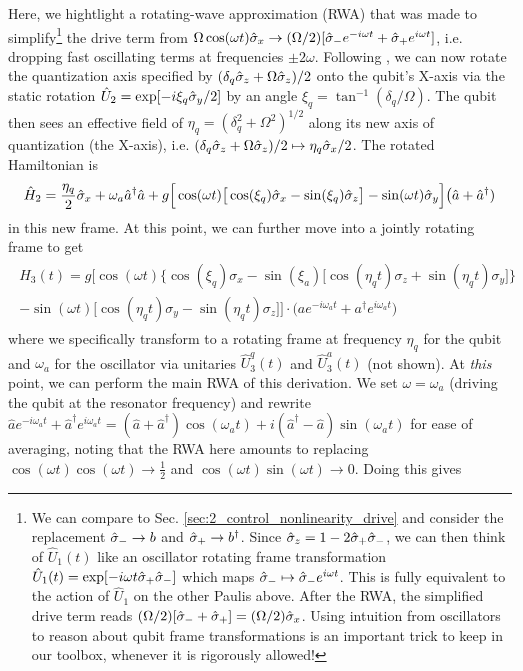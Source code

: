 Here, we hightlight a rotating-wave approximation (RWA) that was made to simplify\footnote{We can compare to Sec. \ref{sec:2_control_nonlinearity_drive} and consider the replacement $\hat{\sigma}_- \to b$ and $\hat{\sigma}_+\to b^\dagger$. Since $\hat{\sigma}_z = 1-2\hat{\sigma}_+\hat{\sigma}_-$, we can then think of $\hat{U}_1(t)$ like an oscillator rotating frame transformation $\hat{U}_1(t) = \exp[-i\omega t \hat{\sigma}_+\hat{\sigma}_-]$ which maps $\hat{\sigma}_- \mapsto \hat{\sigma}_- e^{i\omega t}$. This is fully equivalent to the action of $\hat{U}_1$ on the other Paulis above. After the RWA, the simplified drive term reads $(\Omega/2)[\hat{\sigma}_- + \hat{\sigma}_+] = (\Omega/2)\hat{\sigma}_x$. Using intuition from oscillators to reason about qubit frame transformations is an important trick to keep in our toolbox, whenever it is rigorously allowed!} the drive term from $\Omega \cos(\omega t)\hat{\sigma}_x \to (\Omega/2)[\hat{\sigma}_- e^{-i\omega t} + \hat{\sigma}_+ e^{i\omega t}]$, i.e. dropping fast oscillating terms at frequencies $\pm 2\omega$. Following \cite{rigetti2010fully}, we can now rotate the quantization axis specified by $(\delta_q\hat{\sigma}_z + \Omega\hat{\sigma}_z)/2$ onto the qubit's X-axis via the static rotation $\hat{U}_2 = \exp[-i\xi_q\hat{\sigma}_y/2]$ by an angle $\xi_q = \tan^{-1}(\delta_q/\Omega)$. The qubit then sees an effective field of $\eta_q = (\delta_q^2 + \Omega^2)^{1/2}$ along its new axis of quantization (the X-axis), i.e. $(\delta_q\hat{\sigma}_z + \Omega\hat{\sigma}_z)/2 \mapsto \eta_q\hat{\sigma}_x/2$. The rotated Hamiltonian is
\begin{equation}
\hat{H}_2 = \frac{\eta_q}{2}\hat{\sigma}_x + \omega_a \hat{a}^\dagger \hat{a} + g\Big[\cos(\omega t)\big[\cos(\xi_q)\hat{\sigma}_x -\sin(\xi_q)\hat{\sigma}_z\big]- \sin(\omega t)\hat{\sigma}_y\Big]\big(\hat{a} + \hat{a}^\dagger)
\end{equation}
in this new frame. At this point, we can further move into a jointly rotating frame to get
\begin{align}
\begin{split}
H_3(t) = g\bigg[\cos(\omega t)\Big\{\cos(\xi_q)\sigma_x -\sin(\xi_a)\big[\cos(\eta_q t)\sigma_z + \sin(\eta_q t)\sigma_y\big]\Big\} \\ - \sin(\omega t)\big[\cos(\eta_q t)\sigma_y - \sin(\eta_q t)\sigma_z\big]\bigg]\cdot\Big(a e^{-i\omega_a t} + a^\dagger e^{i\omega_a t}\Big)
\end{split}
\end{align}
where we specifically transform to a rotating frame at frequency $\eta_q$ for the qubit and $\omega_a$ for the oscillator via unitaries $\hat{U}_3^q(t)$ and $\hat{U}_3^a(t)$ (not shown). At \textit{this} point, we can perform the main RWA of this derivation. We set $\omega = \omega_a$ (driving the qubit at the resonator frequency) and rewrite  $\hat{a} e^{-i\omega_a t} + \hat{a}^\dagger e^{i\omega_a t} = (\hat{a}+\hat{a}^\dagger)\cos(\omega_a t) + i(\hat{a}^\dagger - \hat{a})\sin(\omega_a t)$ for ease of averaging, noting that the RWA here amounts to replacing $\cos(\omega t)\cos(\omega t) \to \frac{1}{2}$ and $\cos(\omega t)\sin(\omega t) \to 0$. Doing this gives
